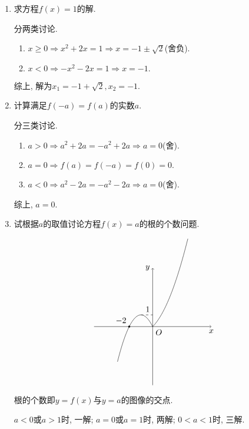 \documentclass[8pt]{article}
\begin{document}
				\begin{enumerate}[label=(\arabic*)]
					\item 求方程$f(x)=1$的解.

						分两类讨论.

						\begin{enumerate}[label=$\arabic*^{\circ}$]
							\item $x\geq 0 \Rightarrow x^2+2x=1 \Rightarrow x=-1\pm \sqrt {2} $(舍负).

							\item $x < 0 \Rightarrow -x^2-2x=1 \Rightarrow x=-1.$
						\end{enumerate}

						综上, 解为$x_1=-1+\sqrt{2}, x_2=-1.$

					\item 计算满足$f(-a)=f(a)$的实数$a$.

						分三类讨论.

						\begin{enumerate}[label=$\arabic*^{\circ}$]
							\item $a > 0 \Rightarrow a^2+2a=-a^2+2a \Rightarrow a=0$(舍).

							\item $a = 0 \Rightarrow f(a)=f(-a)=f(0)=0.$

							\item $a < 0 \Rightarrow a^2-2a=-a^2-2a \Rightarrow a=0$(舍).
						\end{enumerate}

						综上, $a=0.$

					\item 试根据$a$的取值讨论方程$f(x)=a$的根的个数问题.

						$$
						\begin{tikzpicture}[scale=0.5]
				    		\draw[black, ->] (-5, 0)--(5, 0) node[anchor=north] at (5, 0) {$x$};
				    		\draw[black, ->] (0, -5)--(0, 5) node[anchor=east] at (0, 5) {$y$};
				    		\draw[black, domain=-3:0] plot(\x, -\x*\x-2*\x) node[anchor=north west] at (0, 0) {$O$};
				    		\draw[black, domain=0:3] plot(\x, 0.5*\x*\x+\x);
				    		\filldraw[black] (-2, 0) circle (2pt) node[anchor=south east] {$-2$};
				    		\draw[black, dashed] (-1, 1)--(0, 1) node[anchor=south east] at (0, 1) {$1$};
						\end{tikzpicture}
						$$

						根的个数即$y=f(x)$与$y=a$的图像的交点.

						$a<0$或$a>1$时, 一解; $a=0$或$a=1$时, 两解; $0<a<1$时, 三解. 

				\end{enumerate}
\end{document}

